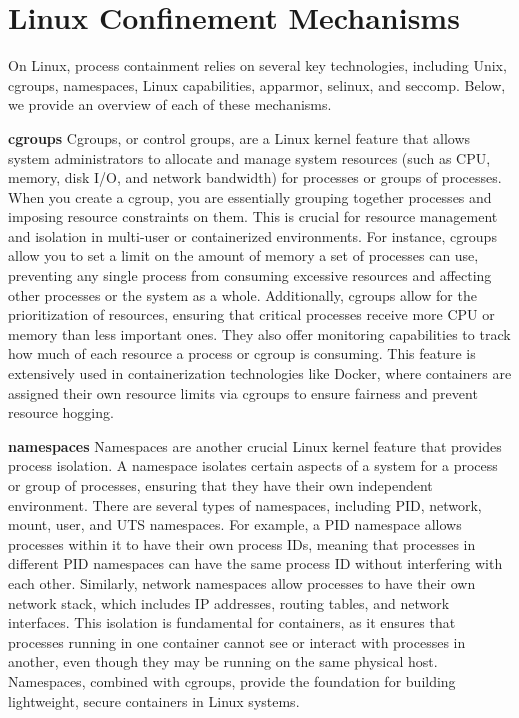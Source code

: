 \section{Linux Confinement Mechanisms}
\label{sec:linux-confinement-mechanisms}

On Linux, process containment relies on several key technologies, including Unix, cgroups, namespaces, Linux capabilities, apparmor, selinux, and seccomp. Below, we provide an overview of each of these mechanisms.

\textbf{cgroups}
Cgroups, or control groups, are a Linux kernel feature that allows system administrators to allocate and manage system resources (such as CPU, memory, disk I/O, and network bandwidth) for processes or groups of processes. When you create a cgroup, you are essentially grouping together processes and imposing resource constraints on them. This is crucial for resource management and isolation in multi-user or containerized environments. For instance, cgroups allow you to set a limit on the amount of memory a set of processes can use, preventing any single process from consuming excessive resources and affecting other processes or the system as a whole. Additionally, cgroups allow for the prioritization of resources, ensuring that critical processes receive more CPU or memory than less important ones. They also offer monitoring capabilities to track how much of each resource a process or cgroup is consuming. This feature is extensively used in containerization technologies like Docker, where containers are assigned their own resource limits via cgroups to ensure fairness and prevent resource hogging.

\textbf{namespaces}
Namespaces are another crucial Linux kernel feature that provides process isolation. A namespace isolates certain aspects of a system for a process or group of processes, ensuring that they have their own independent environment. There are several types of namespaces, including PID, network, mount, user, and UTS namespaces. For example, a PID namespace allows processes within it to have their own process IDs, meaning that processes in different PID namespaces can have the same process ID without interfering with each other. Similarly, network namespaces allow processes to have their own network stack, which includes IP addresses, routing tables, and network interfaces. This isolation is fundamental for containers, as it ensures that processes running in one container cannot see or interact with processes in another, even though they may be running on the same physical host. Namespaces, combined with cgroups, provide the foundation for building lightweight, secure containers in Linux systems.

